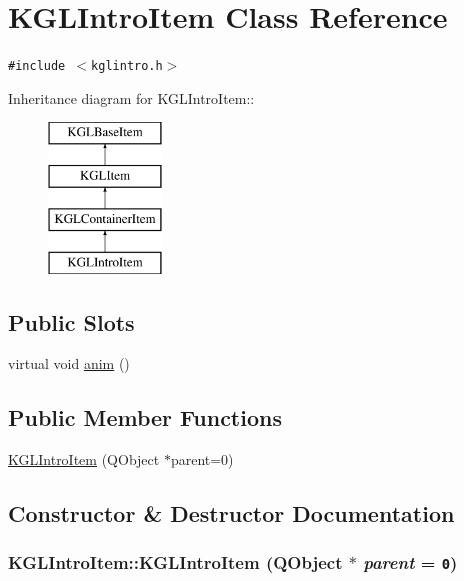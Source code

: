 \hypertarget{class_k_g_l_intro_item}{
\section{KGLIntroItem Class Reference}
\label{class_k_g_l_intro_item}
}
{\tt \#include $<$kglintro.h$>$}

Inheritance diagram for KGLIntroItem::\begin{figure}[H]
\begin{center}
\leavevmode
\includegraphics[height=4cm]{class_k_g_l_intro_item}
\end{center}
\end{figure}
\subsection*{Public Slots}
\begin{CompactItemize}
\item 
virtual void \hyperlink{class_k_g_l_intro_item_123f0b6f3fd34ed385a34b6485db7c2e}{anim} ()
\end{CompactItemize}
\subsection*{Public Member Functions}
\begin{CompactItemize}
\item 
\hyperlink{class_k_g_l_intro_item_66fdbf0f7893053ba01112f473b71f30}{KGLIntroItem} (QObject $\ast$parent=0)
\end{CompactItemize}


\subsection{Constructor \& Destructor Documentation}
\hypertarget{class_k_g_l_intro_item_66fdbf0f7893053ba01112f473b71f30}{
\subsubsection[{KGLIntroItem}]{\setlength{\rightskip}{0pt plus 5cm}KGLIntroItem::KGLIntroItem (QObject $\ast$ {\em parent} = {\tt 0})}}
\label{class_k_g_l_intro_item_66fdbf0f7893053ba01112f473b71f30}





